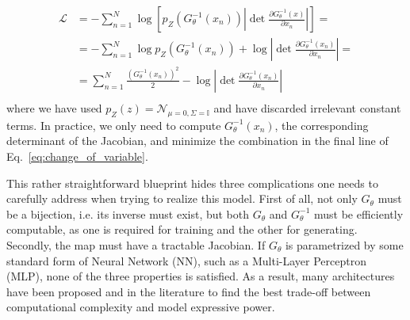 %
\begin{align}\label{eq:change_of_variable}
\mathcal{L} &= - \sum_{n=1}^N \log \left[ p_Z(G_{\theta}^{-1}(x_n)) \left|\det \frac{\partial G_{\theta}^{-1}(x)}{\partial x_n}\right| \right] = \\
&= -\sum_{n=1}^N \log p_Z(G_{\theta}^{-1}(x_n)) + \log \left|\det \frac{\partial G_{\theta}^{-1}(x_n)}{\partial x_n}\right| = \\
&= \sum_{n=1}^N \frac{(G_{\theta}^{-1}(x_n))^2}{2} - \log \left|\det \frac{\partial G_{\theta}^{-1}(x_n)}{\partial x_n}\right|\\
\end{align}
%
where we have used $p_{Z}(z) = \mathcal{N}_{\mu=0, \Sigma=\mathbb{I}}$ and have discarded irrelevant constant terms. 
In practice, we only need to compute $G_{\theta}^{-1}(x_n)$, the corresponding determinant of the Jacobian, and minimize the combination in the final line of Eq.~\ref{eq:change_of_variable}.

This rather straightforward blueprint hides three complications one needs to carefully address when trying to realize this model. First of all, not only $G_{\theta}$ must be a bijection, i.e. its inverse must exist, but both $G_{\theta}$ and $G_{\theta}^{-1}$ must be efficiently computable, as one is required for training and the other for generating. Secondly, the map must have a tractable Jacobian. If $G_{\theta}$ is parametrized by some standard form of Neural Network (NN), such as a Multi-Layer Perceptron (MLP), none of the three properties is satisfied. As a result, many architectures have been proposed and in the literature to find the best trade-off between computational complexity and model expressive power.

